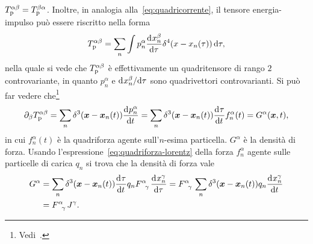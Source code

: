 $T_{\textup{p}}^{\alpha\beta} = T_{\textup{p}}^{\beta\alpha}$.  Inoltre, in
analogia alla~\eqref{eq:quadricorrente}, il tensore energia-impulso può essere
riscritto nella forma
\begin{equation}
  T_{\textup{p}}^{\alpha\beta} = \sum_{n} \int p_{n}^{\alpha}
  \frac{{\mathop{}\!\mathrm{d}^{}}x_{n}^{\beta}}{\mathop{}\!\mathrm{d} {\tau}^{}} \delta^{4}(x - x_{n}(\tau))\mathop{}\!\mathrm{d} \tau,
\end{equation}
nella quale si vede che $T_{\textup{p}}^{\alpha\beta}$ è effettivamente un
quadritensore di rango $2$ controvariante, in quanto $p_{n}^{\alpha}$ e
$\mathrm{d}^{}x_{n}^{\beta} / \mathrm{d} {\tau}^{}$ sono quadrivettori controvarianti.  Si può far
vedere che\footnote{Vedi~\textcite[44]{weinberg:gravitation}.}
\begin{equation}
  \partial_{\beta}T_{\textup{p}}^{\alpha\beta} = \sum_{n}
  \delta^{3}(\bm{x} - \bm{x}_{n}(t)) \frac{{\mathop{}\!\mathrm{d}^{}}p_{n}^{\alpha}}{\mathop{}\!\mathrm{d} {t}^{}} = \sum_{n}
  \delta^{3}(\bm{x} - \bm{x}_{n}(t)) \frac{{\mathop{}\!\mathrm{d}^{}}\tau}{\mathop{}\!\mathrm{d} {t}^{}}f_{n}^{\alpha}(t) =
  G^{\alpha}(\bm{x}, t),
\end{equation}
in cui $f_{n}^{\alpha}(t)$ è la quadriforza agente sull'$n$-esima particella.
$G^{\alpha}$ è la densità di forza.  Usando
l'espressione~\eqref{eq:quadriforza-lorentz} della forza $f_{n}^{\alpha}$ agente
sulle particelle di carica $q_{n}$ si trova che la densità di forza vale
\begin{equation}
  \begin{split}
    G^{\alpha} &= \sum_{n} \delta^{3}(\bm{x} - \bm{x}_{n}(t))
    \toder{\tau}{t}q_{n} \tensor{F}{^{\alpha}_{\gamma}}
    \toder{x_{n}^{\gamma}}{\tau} = \tensor{F}{^{\alpha}_{\gamma}} \sum_{n}
    \delta^{3}(\bm{x} - \bm{x}_{n}(t)) q_{n} \toder{x_{n}^{\gamma}}{t} \\
    &= \tensor{F}{^{\alpha}_{\gamma}} J^{\gamma}.
  \end{split}
\end{equation}

